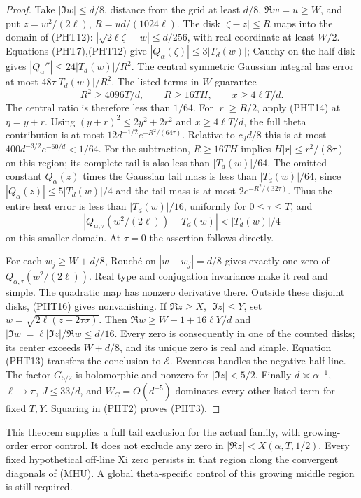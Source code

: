\documentclass[11pt]{article}
\theoremstyle{remark}\newtheorem{remark}[theorem]{Remark}
\begin{document}
\begin{proof}
Take $|\Im w|\le d/8$, distance from the grid at least $d/8$,
$\Re w=u\ge W$, and put $z=w^2/(2\ell)$, $R=ud/(1024\ell)$.
The disk $|\zeta-z|\le R$ maps into the domain of (PHT12):
$|\sqrt{2\ell\zeta}-w|\le d/256$, with real coordinate at least $W/2$.
Equations (PHT7),(PHT12) give $|Q_\alpha(\zeta)|\le3|T_d(w)|$;
Cauchy on the half disk gives $|Q_\alpha''|\le24|T_d(w)|/R^2$.
The central symmetric Gaussian integral has error at most
$48\tau|T_d(w)|/R^2$.
The listed terms in $W$ guarantee
\[
             R^2\ge4096T/d,\qquad R\ge16TH,\qquad
                         x\ge4\ell T/d.                \tag{PHT15}
\]
The central ratio is therefore less than $1/64$.
For $|r|\ge R/2$, apply (PHT14) at $\eta=y+r$.
Using $(y+r)^2\le2y^2+2r^2$ and $x\ge4\ell T/d$, the full
theta contribution is at most
$12d^{-1/2}e^{-R^2/(64\tau)}$.
Relative to $c_dd/8$ this is at most
$400d^{-3/2}e^{-60/d}<1/64$.
For the subtraction, $R\ge16TH$ implies
$H|r|\le r^2/(8\tau)$ on this region; its complete tail is also
less than $|T_d(w)|/64$.
The omitted constant $Q_\alpha(z)$ times the Gaussian tail mass
is less than $|T_d(w)|/64$, since
$|Q_\alpha(z)|\le5|T_d(w)|/4$ and the tail mass is
at most $2e^{-R^2/(32\tau)}$.
Thus the entire heat error is less than $|T_d(w)|/16$,
uniformly for $0\le\tau\le T$, and
\[
 |Q_{\alpha,\tau}(w^2/(2\ell))-T_d(w)|<|T_d(w)|/4         \tag{PHT16}
\]
on this smaller domain. At $\tau=0$ the assertion follows directly.

For each $w_j\ge W+d/8$, Rouch\'e on $|w-w_j|=d/8$ gives
exactly one zero of $Q_{\alpha,\tau}(w^2/(2\ell))$.
Real type and conjugation invariance make it real and simple.
The quadratic map has nonzero derivative there.
Outside these disjoint disks, (PHT16) gives nonvanishing.
If $\Re z\ge X$, $|\Im z|\le Y$, set
$w=\sqrt{2\ell(z-2\tau\sigma)}$.
Then $\Re w\ge W+1+16\ell Y/d$ and
$|\Im w|=\ell|\Im z|/\Re w\le d/16$.
Every zero is consequently in one of the counted disks;
its center exceeds $W+d/8$, and its unique zero is real and simple.
Equation (PHT13) transfers the conclusion to $\mathcal E$.
Evenness handles the negative half-line.
The factor $G_{5/2}$ is holomorphic and nonzero for $|\Im z|<5/2$.
Finally $d\asymp\alpha^{-1}$, $\ell\to\pi$, $J\le33/d$,
and $W_C=O(d^{-5})$ dominates every other listed term for fixed
$T,Y$. Squaring in (PHT2) proves (PHT3).
\end{proof}

This theorem supplies a full tail exclusion for the actual family,
with growing-order error control. It does not exclude any zero
in $|\Re z|<X(\alpha,T,1/2)$.
Every fixed hypothetical off-line Xi zero persists in that region
along the convergent diagonals of (MHU). A global theta-specific
control of this growing middle region is still required.
\end{document}
